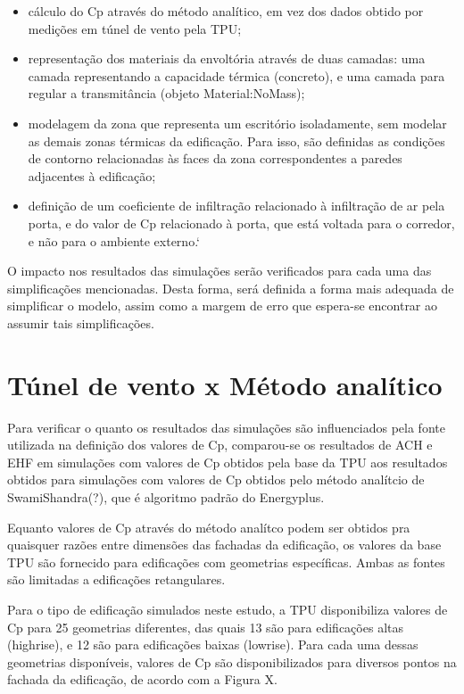 \documentclass[brazil,hardcopy,openany,a5paper]{ufscthesis}
\begin{document}
		\begin{itemize}
		\item cálculo do Cp através do método analítico, em vez dos dados obtido por medições em túnel de vento pela TPU;
		\item representação dos materiais da envoltória através de duas camadas: uma camada representando a capacidade térmica (concreto), e uma camada para regular a transmitância (objeto Material:NoMass);
		\item modelagem da zona que representa um escritório isoladamente, sem modelar as demais zonas térmicas da edificação. Para isso, são definidas as condições de contorno relacionadas às faces da zona correspondentes a paredes adjacentes à edificação;
		\item definição de um coeficiente de infiltração relacionado à infiltração de ar pela porta, e do valor de Cp relacionado à porta, que está voltada para o corredor, e não para o ambiente externo.`
		\end{itemize}
		
		O impacto nos resultados das simulações serão verificados para cada uma das simplificações mencionadas. Desta forma, será definida a forma mais adequada de simplificar o modelo, assim como a margem de erro que espera-se encontrar ao assumir tais simplificações.
		
		\section{Túnel de vento x Método analítico}
		
		Para verificar o quanto os resultados das simulações são influenciados pela fonte utilizada na definição dos valores de Cp, comparou-se os resultados de ACH e EHF em simulações com valores de Cp obtidos pela base da TPU aos resultados obtidos para simulações com valores de Cp obtidos pelo método analítcio de SwamiShandra(?), que é algoritmo padrão do Energyplus.
		
		
		Equanto valores de Cp através do método analítco podem ser obtidos pra quaisquer razões entre dimensões das fachadas da edificação, os valores da base TPU são fornecido para edificações com geometrias específicas. Ambas as fontes são limitadas a edificações retangulares.
		
		Para o tipo de edificação simulados neste estudo, a TPU disponibiliza valores de Cp para 25 geometrias diferentes, das quais 13 são para edificações altas (highrise), e 12 são para edificações baixas (lowrise). Para cada uma dessas geometrias disponíveis, valores de Cp são disponibilizados para diversos pontos na fachada da edificação, de acordo com a Figura X.
		
\end{document}
